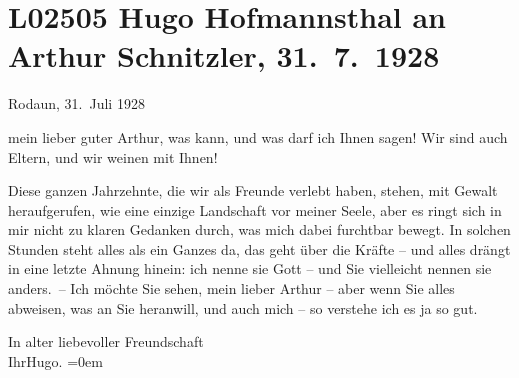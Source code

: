 

\section[Hugo Hofmannsthal an Arthur Schnitzler, 31. 7. 1928]{L02505 Hugo Hofmannsthal an Arthur Schnitzler, 31. 7. 1928}
\nopagebreak{}
\rehead{ }\normalsize\beginnumbering{}
\toendnotes[C]{\smallbreak\pagebreak[2]}
\toendnotes[C]{\smallbreak}
\toendnotes[C]{\smallbreak}
\pstart
           \raggedleft{}{\pb}Rodaun, 31. Juli 1928\pend
           
\pstart{}mein lieber guter Arthur,\pend\vspace{0.5em}
\pstart
           was kann, und was darf ich Ihnen sagen! Wir sind auch Eltern, und wir weinen mit Ihnen!\pend
           
\pstart
           Diese ganzen Jahrzehnte, die wir als Freunde verlebt haben, stehen, mit Gewalt
               heraufgerufen, wie eine einzige Landschaft vor meiner Seele, aber es ringt sich in
               mir nicht zu klaren Gedanken durch, was mich dabei furchtbar bewegt. In solchen
               Stunden steht alles als ein Ganzes da, das geht über die Kräfte – und alles drängt in
               eine letzte Ahnung hinein: ich nenne sie Gott – und Sie vielleicht nennen sie
               anders. – Ich möchte Sie sehen, mein lieber Arthur – aber wenn Sie alles abweisen,
               was an Sie heranwill, und auch mich – so verstehe ich es ja so gut.\pend
           
\pstart
           In alter liebevoller Freundschaft{\\[\baselineskip]}Ihr\spacefill\mbox{Hugo.}\pend
           \leftskip=0em{}\endnumbering{}  \newcommand{\dateiname}{L02505}\newcommand{\titel}{Hugo Hofmannsthal an Arthur Schnitzler, 31. 7. 1928}\newcommand{\editorInnen}{Martin Anton Müller und Gerd-Hermann Susen}
